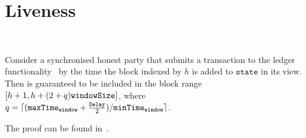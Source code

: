 \section{Liveness} \ \\
\label{sec:liveness}

\begin{proposition}
  \label{prop:liveness}
  Consider a synchronised honest party that submits a transaction \tx to the
  ledger functionality~\cite{genesis} by the time the block indexed by $h$ is
  added to $\texttt{state}$ in its view. Then \tx is guaranteed to be included
  in the block range $[h+1, h + (2 + q) \texttt{windowSize}]$, where $q = \lceil
  (\texttt{maxTime}_\texttt{window} + \frac{\texttt{Delay}}{2})/ \texttt{minTime}_\texttt{window} \rceil$.
\end{proposition}

The proof can be found in~\cite{DBLP:conf/csfw/KiayiasL20}.
